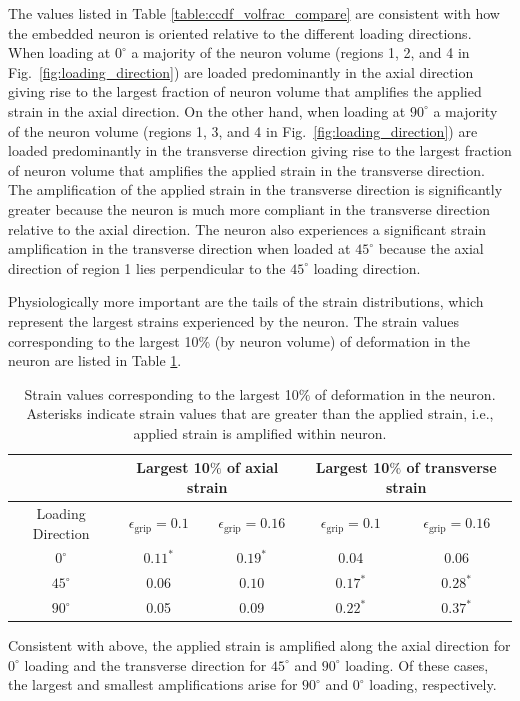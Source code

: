 \documentclass[]{interact}
\begin{document}
The values listed in Table \ref{table:ccdf_volfrac_compare} are consistent with how the embedded neuron is oriented relative to the different loading directions. When loading at $0^{\circ}$ a majority of the neuron volume (regions 1, 2, and 4 in Fig.\ \ref{fig:loading_direction}) are loaded predominantly in the axial direction giving rise to the largest fraction of neuron volume that amplifies the applied strain in the axial direction. On the other hand, when loading at $90^{\circ}$ a majority of the neuron volume (regions 1, 3, and 4 in Fig.\ \ref{fig:loading_direction}) are loaded predominantly in the transverse direction giving rise to the largest fraction of neuron volume that amplifies the applied strain in the transverse direction. The amplification of the applied strain in the transverse direction is significantly greater because the neuron is much more compliant in the transverse direction relative to the axial direction.  The neuron also experiences a significant strain amplification in the transverse direction when loaded at $45^{\circ}$ because the axial direction of region 1 lies perpendicular to the $45^{\circ}$ loading direction.

Physiologically more important are the tails of the strain distributions, which represent the largest strains experienced by the neuron. The strain values corresponding to the largest 10$\%$ (by neuron volume) of deformation in the neuron are listed in Table \ref{table:ccdf_tail_strains}. 
%
\begin{table}[ht]
\begin{center}
\begin{tabular}{ c c c c c }
\hline\hline
& \multicolumn{2}{c}{Largest 10$\%$ of axial strain} & \multicolumn{2}{c}{Largest 10$\%$ of transverse strain} \\ \hline 
Loading Direction & $\epsilon_{\text{grip}}=0.1$ & $\epsilon_{\text{grip}}=0.16$ & $\epsilon_{\text{grip}}=0.1$ & $\epsilon_{\text{grip}}=0.16$ \\
\hline 
$0^{\circ}$ & $0.11^*$ & $0.19^*$ & 0.04 & 0.06\\ 
$45^{\circ}$ & $0.06$ & $0.10$ & $0.17^*$ & $0.28^*$\\
$90^{\circ}$ & 0.05 & 0.09 & $0.22^*$ & $0.37^*$\\ \hline \hline
\end{tabular}
\end{center}
\caption{Strain values corresponding to the largest 10$\%$ of deformation in the neuron. Asterisks indicate strain values that are greater than the applied strain, i.e., applied strain is amplified within neuron.}
\label{table:ccdf_tail_strains}
\end{table}
%
Consistent with above, the applied strain is amplified along the axial direction for $0^{\circ}$ loading and the transverse direction for $45^{\circ}$ and $90^{\circ}$ loading. Of these cases, the largest and smallest amplifications arise for $90^{\circ}$ and $0^{\circ}$ loading, respectively.
\end{document}
